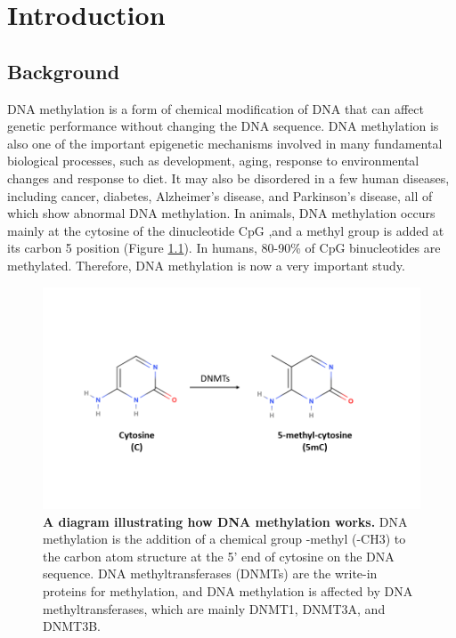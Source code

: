 \documentclass{PHlab-thesis}
\begin{document}
\printnomenclature[5cm]

\newpage
\setcounter{page}{1}



\chapter{Introduction}
\section{Background}
DNA methylation is a form of chemical modification of DNA that can affect genetic performance without changing the DNA sequence\cite{guo2013bs}. DNA methylation is also one of the important epigenetic mechanisms involved in many fundamental biological processes, such as development, aging, response to environmental changes and response to diet. It may also be disordered in a few human diseases, including cancer, diabetes, Alzheimer’s disease, and Parkinson’s disease, all of which show abnormal DNA methylation. In animals, DNA methylation occurs mainly at the cytosine of the dinucleotide CpG ,and a methyl group is added at its carbon 5 position (Figure \ref{f1}). In humans, 80-90\% of CpG binucleotides are methylated. Therefore, DNA methylation is now a very important study.

\begin{figure}[h!]
  \centering
  \includegraphics[scale=0.8]{figures/dna_methylation.png}
  \caption{\textbf{A diagram illustrating how DNA methylation works.}
  DNA methylation is the addition of a chemical group -methyl (-CH3) to the carbon atom structure at the 5' end of cytosine on the DNA sequence. DNA methyltransferases (DNMTs) are the write-in proteins for methylation, and DNA methylation is affected by DNA methyltransferases, which are mainly DNMT1, DNMT3A, and DNMT3B. }
  \label{f1}
\end{figure}
\end{document}
